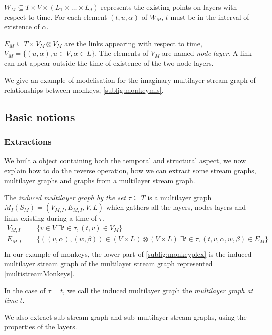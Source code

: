 \documentclass{svproc}
\begin{document}
	$W_M \subseteq T\times V \times (L_1 \times \dots \times L_d)$ represents the existing points on layers with respect to time. For each element $(t,u,\alpha)$ of $W_M$, $t$ must be in the interval of existence of $\alpha$.

   $E_M \subseteq T\times V_M \otimes V_M$ are the links appearing with respect to time,  $V_M = \{ (u,\alpha), u\in V, \alpha \in L\}$. The elements of $V_M$ are named {\em node-layer}. A link can not appear outside the time of existence of the two node-layers.

   We give an example of modelisation for the imaginary multilayer stream graph of relationships between monkeys, \cref{subfig:monkeymls}.


%
\subsection{Basic notions}
%
\subsubsection{Extractions}

We built a object containing both the temporal and structural aspect, we now explain how to do the reverse operation, how we can extract some stream graphs, multilayer graphs and graphs from a multilayer stream graph.

\begin{definition}
    The {\em induced multilayer graph by the set } $\tau \subseteq T$ is a multilayer graph $M_I(S_M)=(V_{M,I}, E_{M,I}, V,L)$ which gathers all the layers, nodes-layers and links existing during a time of $\tau$.
    \begin{align*}
    	V_{M,I} & = \{ v \in V | \exists t \in \tau, (t,v) \in V_M\}\\
    	E_{M,I} & = \{((v,\alpha),(w,\beta)) \in (V\times L)\otimes (V\times L) | \exists t \in \tau , (t,v,\alpha,w,\beta) \in E_M \} \\
    \end{align*}
    In our example of monkeys, the lower part of \cref{subfig:monkeyplex} is the induced multilayer stream graph of the multilayer stream graph represented \cref{multistreamMonkeys}.
\end{definition}

In the case of $\tau={t}$, we call the induced multilayer graph the {\em multilayer graph at time} $t$.

We also extract sub-stream graph and sub-multilayer stream graphs, using the properties of the layers.
\end{document}
